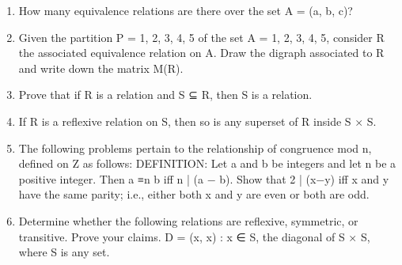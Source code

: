 \documentclass[a4paper]{article}
\begin{document}
\begin{enumerate}
\item How many equivalence relations are there over the set A = (a, b, c)?


\item Given the partition P = {{1, 2}, {3}, {4, 5}} of the set A = {1, 2, 3, 4, 5},
consider R the associated equivalence relation on A. Draw the digraph
associated to R and write down the matrix M(R).

\item  Prove that if R is a relation and S ⊆ R, then S is a relation.

\item  If R is a reflexive relation on S, then so is any superset of R inside S × S.

\item The following problems pertain to the relationship of congruence mod n, defined on Z as follows:
DEFINITION: Let a and b be integers and let n be a positive integer. Then a ≡n b iff n | (a − b).
Show that 2 | (x−y) iff x and y have the same parity; i.e., either both x and y are even or both are odd.

\item Determine whether the following relations are reflexive, symmetric, or transitive. Prove your claims.
 D = {(x, x) : x ∈ S}, the diagonal of S × S, where S is any set. 
\end{enumerate}
\end{document}

